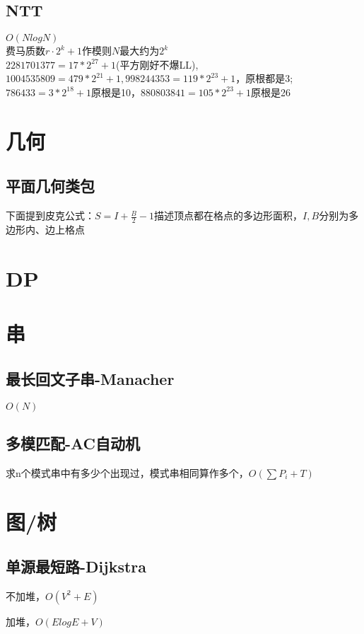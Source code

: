 \documentclass[10pt]{article}
\begin{document}
\subsection{NTT}
$O(NlogN)$\\
费马质数$r\cdot 2^k+1$作模则$N$最大约为$2^k$\\
$2281701377=17*2^{27}+1$(平方刚好不爆LL), $1004535809=479*2^{21}+1, 998244353=119*2^{23}+1$，原根都是3;\\
$786433=3*2^{18}+1$原根是10，$880803841=105*2^{23}+1$原根是26

\section{几何}
\subsection{平面几何类包}
下面提到皮克公式：$S=I+\frac{B}{2}-1$描述顶点都在格点的多边形面积，$I, B$分别为多边形内、边上格点

\section{DP}
\section{串}
\subsection{最长回文子串-Manacher}
$O(N)$

\subsection{多模匹配-AC自动机}
求n个模式串中有多少个出现过，模式串相同算作多个，$O(\sum P_i+T)$

\section{图/树}
\subsection{单源最短路-Dijkstra}
不加堆，$O(V^2+E)$

加堆，$O(ElogE+V)$

\end{document}
